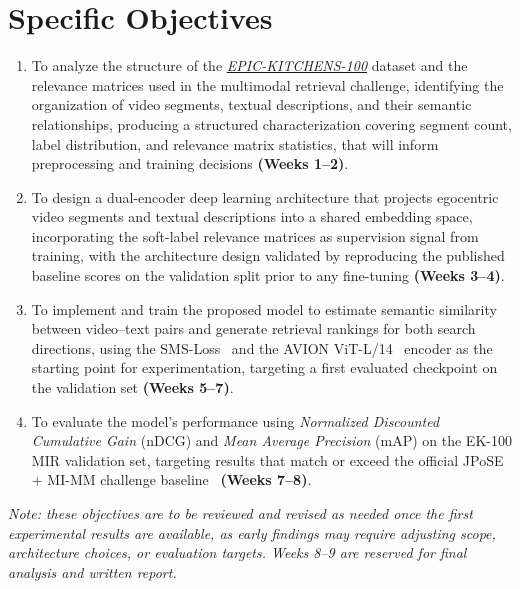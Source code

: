 \section{Specific Objectives}
\label{sec:objectives}

\begin{enumerate}

\item To analyze the structure of the \href{https://epic-kitchens.github.io/}{\textit{EPIC-KITCHENS-100}} dataset and the relevance matrices used in the multimodal retrieval challenge, identifying the organization of video segments, textual descriptions, and their semantic relationships, producing a structured characterization covering segment count, label distribution, and relevance matrix statistics, that will inform preprocessing and training decisions \textbf{(Weeks 1--2)}.

\item To design a dual-encoder deep learning architecture that projects egocentric video segments and textual descriptions into a shared embedding space, incorporating the soft-label relevance matrices as supervision signal from training, with the architecture design validated by reproducing the published baseline scores on the validation split prior to any fine-tuning \textbf{(Weeks 3--4)}.

\item To implement and train the proposed model to estimate semantic similarity between video--text pairs and generate retrieval rankings for both search directions, using the SMS-Loss~\cite{wang2024symmetricmultisimilaritylossepickitchens100} and the AVION ViT-L/14~\cite{zhao2023avion} encoder as the starting point for experimentation, targeting a first evaluated checkpoint on the validation set \textbf{(Weeks 5--7)}.

\item To evaluate the model's performance using \textit{Normalized Discounted Cumulative Gain} (nDCG) and \textit{Mean Average Precision} (mAP) on the EK-100 MIR validation set, targeting results that match or exceed the official JPoSE + MI-MM challenge baseline~\cite{wray2019jpose,miech2020milnce} \textbf{(Weeks 7--8)}.

\end{enumerate}

\noindent\textit{Note: these objectives are to be reviewed and revised as needed once the first experimental results are available, as early findings may require adjusting scope, architecture choices, or evaluation targets. Weeks 8--9 are reserved for final analysis and written report.}